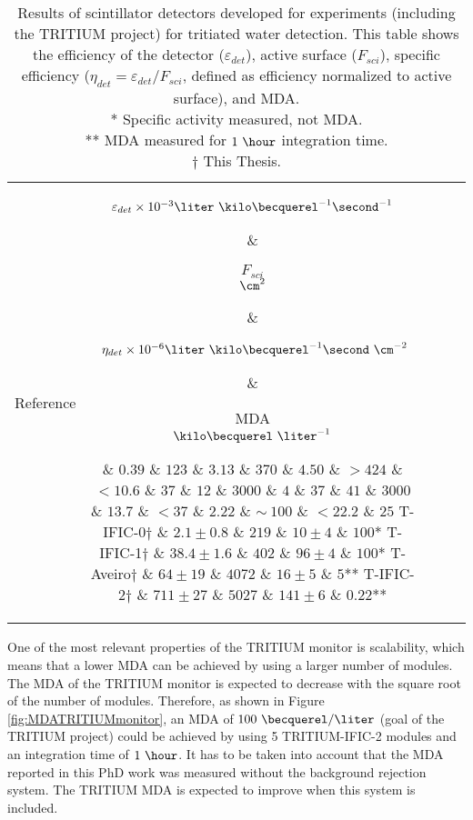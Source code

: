 \begin{enumerate}
\begin{table}[htbp]
\centering{}%
\begin{tabular}{lcrcc}
\toprule 
Reference & \parbox{5em}{$\varepsilon_{det}\times10^{-3}\\\liter~\kilo\becquerel^{-1}\second^{-1}$}  & \parbox{3.5em}{\raggedleft $F_{sci}$\\ $\cm^2$}  & \parbox{6.5em}{$~\eta_{det}\times 10^{-6}\\\liter~\kilo\becquerel^{-1}\second~\cm^{-2}$} &  \parbox{3.5em}{MDA\\$\kilo\becquerel~\liter^{-1}$} \tabularnewline
\midrule
\midrule 
\cite{Muramatsu} & $0.39$ & $123$ & $3.13$ & $370$ \tabularnewline
\cite{Moghissi} & $4.50$ & $>424$ & $<10.6$ & $37$ \tabularnewline
\cite{Osborne} & $12$ & $3000$ & $4$ & $37$ \tabularnewline
\cite{Ratnakaran} & $41$ & $3000$ & $13.7$ & $<37$ \tabularnewline
\cite{Hofstetter1} & $2.22$ & $\sim~100$ & $<22.2$ & $25$ \tabularnewline
T-IFIC-0$\dagger$ & $2.1 \pm 0.8$ & $219$ & $10 \pm 4$ & $100$* \tabularnewline
T-IFIC-1$\dagger$ & $38.4 \pm 1.6$ & $402$ & $96 \pm 4$ & $100$* \tabularnewline
T-Aveiro$\dagger$ & $64 \pm 19$ & $4072$ & $16 \pm 5$ & $5$** \tabularnewline
T-IFIC-2$\dagger$ & $711 \pm 27$ & $5027$ & $141 \pm 6$ & $0.22$** \tabularnewline
\bottomrule
\end{tabular}
\caption{Results of scintillator detectors developed for experiments (including the TRITIUM project) for tritiated water detection. This table shows the efficiency of the detector ($\varepsilon_{det}$), active surface ($F_{sci}$), specific efficiency ($\eta_{det}=\varepsilon_{det}/F_{sci}$, defined as efficiency normalized to active surface), and MDA.\\
* Specific activity measured, not MDA.\\ 
** MDA measured for $1~\hour$ integration time.\\
$\dagger$ This Thesis.}
\label{tab:ComparisonResultsTritium}
\end{table}

One of the most relevant properties of the TRITIUM monitor is scalability, which means that a lower MDA can be achieved by using a larger number of modules. The MDA of the TRITIUM monitor is expected to decrease with the square root of the number of modules. Therefore, as shown in Figure \ref{fig:MDATRITIUMmonitor}, an MDA of  $100~\becquerel/\liter$ (goal of the TRITIUM project) could be achieved by using 5 TRITIUM-IFIC-2 modules and an integration time of $1~\hour$. It has to be taken into account that the MDA reported in this PhD work was measured without the background rejection system. The TRITIUM MDA is expected to improve when this system is included.


\end{enumerate}
